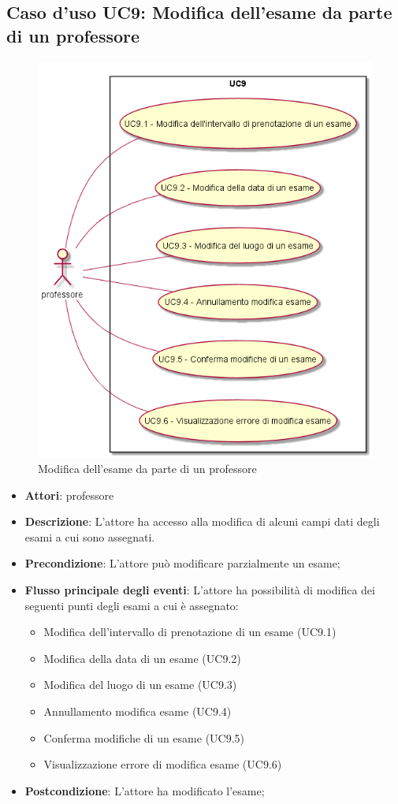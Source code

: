 \subsection{Caso d'uso \texorpdfstring{UC9}{UC9}: Modifica dell'esame da parte di un professore}
\begin{figure} [H]
\centering
\includegraphics[scale=0.45]{./img/UC9.png}
\caption{Modifica dell'esame da parte di un professore}\label{}
\end{figure}
\begin{itemize}
\item \textbf{Attori}: professore
\item \textbf{Descrizione}: L'attore ha accesso alla modifica di alcuni campi dati degli esami a cui sono assegnati.
\item \textbf{Precondizione}: L'attore può modificare parzialmente un esame;
\item \textbf{Flusso principale degli eventi}: L'attore ha possibilità di modifica dei seguenti punti degli esami a cui è assegnato:
\begin{itemize}
\item Modifica dell'intervallo di prenotazione di un esame (UC9.1)
\item Modifica della data di un esame (UC9.2)
\item Modifica del luogo di un esame (UC9.3)
\item Annullamento modifica esame (UC9.4)
\item Conferma modifiche di un esame (UC9.5)
\item Visualizzazione errore di modifica esame (UC9.6)
\end{itemize}
\item \textbf{Postcondizione}: L'attore ha modificato l'esame;
\end{itemize}
